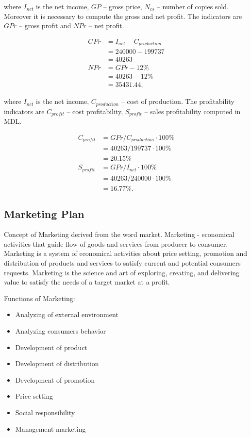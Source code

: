 \noindent
where $I_{net}$ is the net income, $GP$ -- gross price, $N_{cs}$ -- number of copies sold. Moreover it is necessary to compute the gross and net profit. The indicators are $GPr$ -- gross profit and $NPr$ -- net profit.

\begin{equation}
 \begin{split}
  GPr &= I_{net} - C_{production}\\
              &= 240000 - 199737\\
              &= 40263\\
  NPr &= GPr - 12\% \\
             &= 40263 - 12\% \\
             &= 35431.44,
 \end{split}
\end{equation}

\noindent
where $I_{net}$ is the net income, $C_{production}$ -- cost of production. The profitability indicators are $C_{profit}$ -- cost profitability, $S_{profit}$ -- sales profitability computed in MDL.

\begin{equation}
 \begin{split}
  C_{profit} &= GPr / C_{production} \cdot 100\%\\
              &= 40263 / 199737 \cdot 100\% \\
              &= 20.15 \%\\
  S_{profit} &= GPr / I_{net} \cdot 100\% \\
             &= 40263 / 240000 \cdot 100\% \\
             &= 16.77 \%.
 \end{split}
\end{equation}

\subsection{Marketing Plan}
Concept of Marketing derived from the word market. Marketing - economical activities that guide flow of goods and services from producer to consumer.  Marketing is a system of economical activities about price setting, promotion and distribution of products and services to satisfy current and potential consumers requests. Marketing is the science and art of exploring, creating, and delivering value to satisfy the needs of a target market at a profit.

 Functions of Marketing:
 \begin{itemize}
 \item Analyzing of external environment
 \item Analyzing consumers behavior
 \item Development of product
 \item Development of distribution
 \item Development of promotion
 \item Price setting
 \item Social responsibility
 \item Management marketing
\end{itemize}

